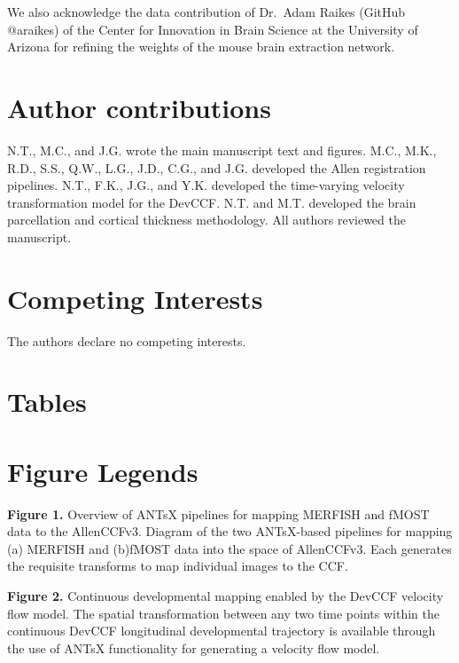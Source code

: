 \documentclass[
  12pt,
]{article}
\begin{document}
We also acknowledge the data contribution of Dr.~Adam Raikes (GitHub
@araikes) of the Center for Innovation in Brain Science at the
University of Arizona for refining the weights of the mouse brain
extraction network.

\clearpage

\section*{Author contributions}\label{author-contributions}

N.T., M.C., and J.G. wrote the main manuscript text and figures. M.C.,
M.K., R.D., S.S., Q.W., L.G., J.D., C.G., and J.G. developed the Allen
registration pipelines. N.T., F.K., J.G., and Y.K. developed the
time-varying velocity transformation model for the DevCCF. N.T. and M.T.
developed the brain parcellation and cortical thickness methodology. All
authors reviewed the manuscript. \clearpage

\section*{Competing Interests}\label{competing-interests}

The authors declare no competing interests. \clearpage 

\section*{Tables}\label{tables}



\clearpage

\section{Figure Legends}\label{figure-legends}

\textbf{Figure 1.} Overview of ANTsX pipelines for mapping MERFISH and
fMOST data to the AllenCCFv3. Diagram of the two ANTsX-based pipelines
for mapping (a) MERFISH and (b)fMOST data into the space of AllenCCFv3.
Each generates the requisite transforms to map individual images to the
CCF.

\textbf{Figure 2.} Continuous developmental mapping enabled by the
DevCCF velocity flow model. The spatial transformation between any two
time points within the continuous DevCCF longitudinal developmental
trajectory is available through the use of ANTsX functionality for
generating a velocity flow model.
\end{document}
